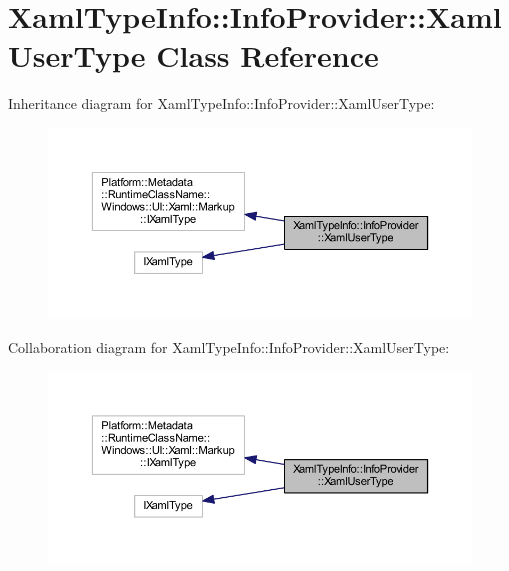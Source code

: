 \hypertarget{class_xaml_type_info_1_1_info_provider_1_1_xaml_user_type}{}\section{Xaml\+Type\+Info\+:\+:Info\+Provider\+:\+:Xaml\+User\+Type Class Reference}
\label{class_xaml_type_info_1_1_info_provider_1_1_xaml_user_type}


Inheritance diagram for Xaml\+Type\+Info\+:\+:Info\+Provider\+:\+:Xaml\+User\+Type\+:\nopagebreak
\begin{figure}[H]
\begin{center}
\leavevmode
\includegraphics[width=350pt]{class_xaml_type_info_1_1_info_provider_1_1_xaml_user_type__inherit__graph}
\end{center}
\end{figure}


Collaboration diagram for Xaml\+Type\+Info\+:\+:Info\+Provider\+:\+:Xaml\+User\+Type\+:\nopagebreak
\begin{figure}[H]
\begin{center}
\leavevmode
\includegraphics[width=350pt]{class_xaml_type_info_1_1_info_provider_1_1_xaml_user_type__coll__graph}
\end{center}
\end{figure}
